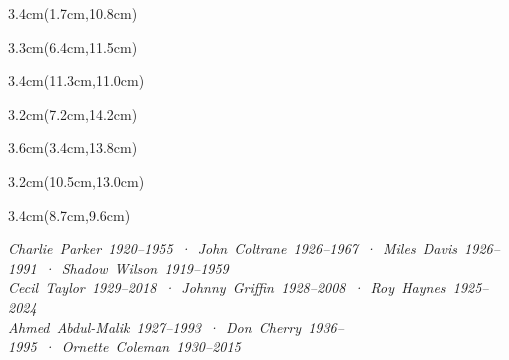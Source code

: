 \begin{minipage}[t][\textheight][s]{\textwidth}
\begin{textblock*}{3.4cm}(1.7cm,10.8cm)
\centering
{}%
\end{textblock*}

\begin{textblock*}{3.3cm}(6.4cm,11.5cm)
\centering
{}%
\end{textblock*}

\begin{textblock*}{3.4cm}(11.3cm,11.0cm)
\centering
{}%
\end{textblock*}

\begin{textblock*}{3.2cm}(7.2cm,14.2cm)
\centering
{}%
\end{textblock*}

\begin{textblock*}{3.6cm}(3.4cm,13.8cm)
\centering
{}%
\end{textblock*}

\begin{textblock*}{3.2cm}(10.5cm,13.0cm)
\centering
{}%
\end{textblock*}

\begin{textblock*}{3.4cm}(8.7cm,9.6cm)
\centering
{}%
\end{textblock*}

\vfill


\begin{center}
{\tiny\itshape Charlie~Parker~\textup{1920--1955}~·~John~Coltrane~\textup{1926--1967}~·~Miles~Davis~\textup{1926--1991}~·~Shadow~Wilson~\textup{1919--1959}}\\
{\tiny\itshape Cecil~Taylor~\textup{1929--2018}~·~Johnny~Griffin~\textup{1928--2008}~·~Roy~Haynes~\textup{1925--2024}}\\
{\tiny\itshape Ahmed~Abdul-Malik~\textup{1927--1993}~·~Don~Cherry~\textup{1936--1995}~·~Ornette~Coleman~\textup{1930--2015}}
\end{center}

\end{minipage}
